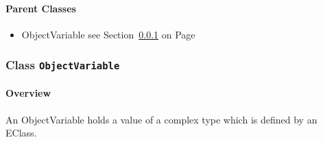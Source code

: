 	



\paragraph{Parent Classes}
\begin{itemize}
\item ObjectVariable see Section~\ref{cls:modeling::patterns::ObjectVariable} on Page~\pageref{cls:modeling::patterns::ObjectVariable}\end{itemize}
\subsubsection{\Large{Class \bfseries \texttt{ObjectVariable}\normalfont}}
\label{cls:modeling::patterns::ObjectVariable} 
\paragraph{Overview}

	
			
An ObjectVariable holds a value of a complex type which is defined by an EClass. 	
		
	


